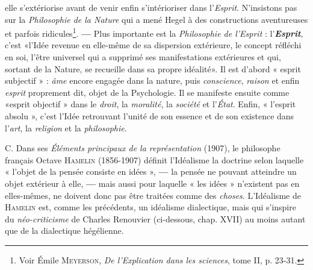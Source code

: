 elle s’extériorise avant de venir enfin s’intérioriser dans l’{\it Esprit}.
N’insistons pas sur la {\it Philosophie de la Nature} qui a mené Hegel à
des constructions aventureuses et parfois ridicules\footnote{Voir Émile \textsc{Meyerson}, {\it De l'Explication dans les sciences}, tome II, p. 23-31.}. {\bf —} Plus importante
est la {\it Philosophie de l'Esprit} : l'\textbf{\textit {Esprit}}, c’est «l’Idée revenue en
elle-même de sa dispersion extérieure, le concept réfléchi en soi,
l'être universel qui a supprimé ses manifestations extérieures et qui,
sortant de la Nature, se recueille dans sa propre idéalité». Il est
d’abord « esprit subjectif » : {\it âme} encore engagée dans la nature, puis
{\it conscience}, {\it raison} et enfin {\it esprit} proprement dit, objet de la Psychologie.
Il se manifeste ensuite comme «esprit objectif » dans le {\it droit},
la {\it moralité}, la {\it société} et l’{\it État}. Enfin, « l'esprit absolu », c’est l’Idée
retrouvant l'unité de son essence et de son existence dans l’{\it art}, la
{\it religion} et la {\it philosophie}.

C. Dans ses {\it Éléments principaux de la représentation} (1907), le
philosophe français Octave \textsc{Hamelin} (1856-1907) définit l’Idéalisme
la doctrine selon laquelle « l’objet de la pensée consiste en idées », {\bf —}
la pensée ne pouvant atteindre un objet extérieur à elle, {\bf —} mais aussi
pour laquelle « les idées » n’existent pas en elles-mêmes, ne doivent
donc pas être traitées comme des {\it choses}. L’Idéalisme de \textsc{Hamelin} est,
comme les précédents, un idéalisme dialectique, mais qui s’inspire
du {\it néo-criticisme} de Charles Renouvier (ci-dessous, chap. XVII) au
moins autant que de la dialectique hégélienne.


